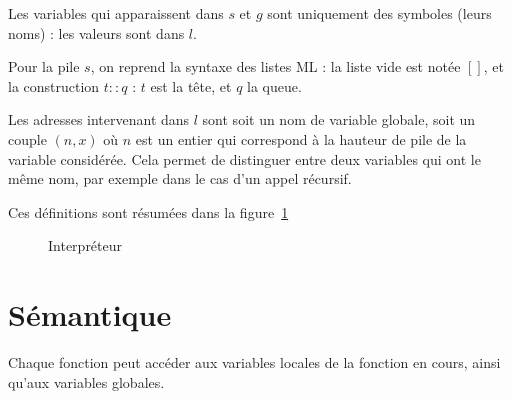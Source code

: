 Les variables qui apparaissent dans $s$ et $g$ sont uniquement des symboles
(leurs noms) : les valeurs sont dans $l$.

Pour la pile $s$, on reprend la syntaxe des listes ML : la liste vide est notée
$[]$, et la construction $t::q$ : $t$ est la tête, et $q$ la queue.

Les adresses intervenant dans $l$ sont soit un nom de variable globale, soit un
couple $(n, x)$ où $n$ est un entier qui correspond à la hauteur de pile de la
variable considérée. Cela permet de distinguer entre deux variables qui ont le
même nom, par exemple dans le cas d'un appel récursif.

Ces définitions sont résumées dans la figure~\ref{fig:interp}

\begin{figure}





  \caption{Interpréteur}
  \label{fig:interp}
\end{figure}

\section{Sémantique}

Chaque fonction peut accéder aux variables locales de la fonction en cours,
ainsi qu'aux variables globales.

